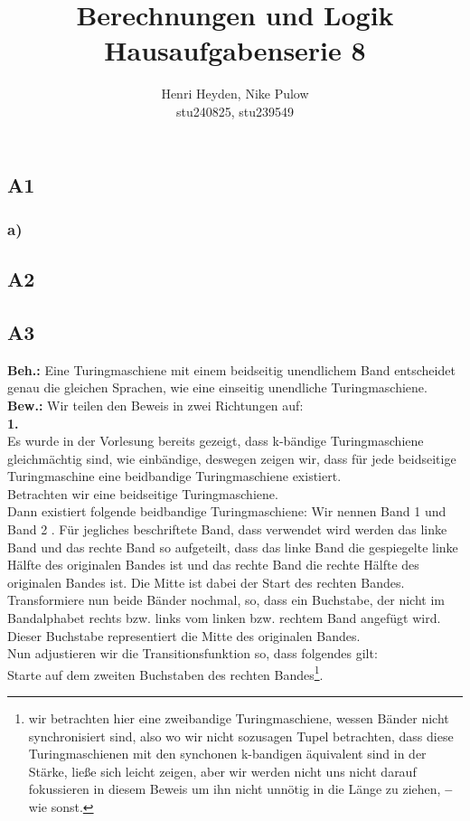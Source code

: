 \documentclass[12pt, a4paper]{article}
\title{Berechnungen und Logik\\Hausaufgabenserie 8}
\author{Henri Heyden, Nike Pulow \\ \small stu240825, stu239549}
\date{}
\newcommand*{\gedanke}{\textbf{-- }}
\newcommand*{\gap}{\text{ }}
\newcommand*{\beh}{\textbf{Beh.:} \gap}
\newcommand*{\bew}{\textbf{Bew.:} \gap}
\begin{document}
\maketitle

\onehalfspacing
\vspace*{-2cm}
\subsection*{A1}
\subsubsection*{a)}
\subsection*{A2}
\subsection*{A3}
\beh Eine Turingmaschiene mit einem beidseitig unendlichem Band entscheidet genau die gleichen Sprachen, wie eine einseitig unendliche Turingmaschiene. \\
\bew Wir teilen den Beweis in zwei Richtungen auf: \\
\textbf{1. } \textquote{\(\Rightarrow\)} \\
Es wurde in der Vorlesung bereits gezeigt, dass k-bändige Turingmaschiene gleichmächtig sind, wie einbändige, deswegen zeigen wir, dass für jede beidseitige Turingmaschine eine beidbandige Turingmaschiene existiert. \\
Betrachten wir eine beidseitige Turingmaschiene. \\
Dann existiert folgende beidbandige Turingmaschiene: Wir nennen Band 1  und Band 2 . Für jegliches beschriftete Band, dass verwendet wird werden das linke Band und das rechte Band so aufgeteilt, dass das linke Band die gespiegelte linke Hälfte des originalen Bandes ist und das rechte Band die rechte Hälfte des originalen Bandes ist. Die Mitte ist dabei der Start des rechten Bandes.\\
Transformiere nun beide Bänder nochmal, so, dass ein Buchstabe, der nicht im Bandalphabet rechts bzw. links vom linken bzw. rechtem Band angefügt wird. Dieser Buchstabe representiert die Mitte des originalen Bandes. \\
Nun adjustieren wir die Transitionsfunktion so, dass folgendes gilt:\\
Starte auf dem zweiten Buchstaben des rechten Bandes\footnote[1]{wir betrachten hier eine zweibandige Turingmaschiene, wessen Bänder nicht synchronisiert sind, also wo wir nicht sozusagen Tupel betrachten, dass diese Turingmaschienen mit den synchonen k-bandigen äquivalent sind in der Stärke, ließe sich leicht zeigen, aber wir werden nicht uns nicht darauf fokussieren in diesem Beweis um ihn nicht unnötig in die Länge zu ziehen, \gedanke wie sonst.}.\\
\end{document}
